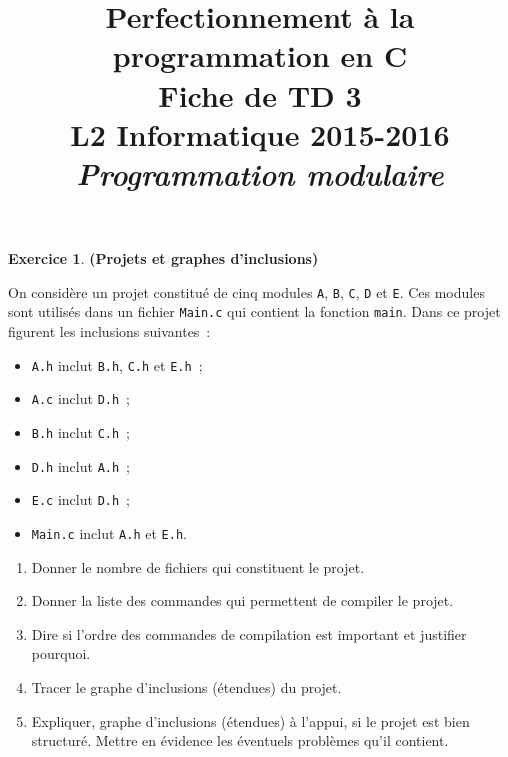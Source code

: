 \documentclass[12pt]{article}
\date{}
\title{{\bf Perfectionnement à la programmation en {\sf C}} \\
    Fiche de TD 3 \\
    {\small L2 Informatique 2015-2016} \\
    {\it \small Programmation modulaire}}
\theoremstyle{definition}
\newtheorem{Exercice}{Exercice}
\begin{document}
\maketitle

\begin{Exercice} {\bf (Projets et graphes d'inclusions)} \smallskip

    On considère un projet constitué de cinq modules {\tt A}, {\tt B},
    {\tt C}, {\tt D} et {\tt E}. Ces modules sont utilisés dans un
    fichier {\tt Main.c} qui contient la fonction {\tt main}. Dans ce
    projet figurent les inclusions suivantes~:
    \begin{multicols}{2}
    \begin{itemize}
        \item {\tt A.h} inclut {\tt B.h}, {\tt C.h} et {\tt E.h}~;
        \item {\tt A.c} inclut {\tt D.h}~;
        \item {\tt B.h} inclut {\tt C.h}~;
        \item {\tt D.h} inclut {\tt A.h}~;
        \item {\tt E.c} inclut {\tt D.h}~;
        \item {\tt Main.c} inclut {\tt A.h} et {\tt E.h}.
    \end{itemize}
    \end{multicols}

    \begin{enumerate}
        \item Donner le nombre de fichiers qui constituent le projet.
        \smallskip

        \item Donner la liste des commandes qui permettent de compiler
        le projet.
        \smallskip

        \item Dire si l'ordre des commandes de compilation est important
        et justifier pourquoi.
        \smallskip

        \item Tracer le graphe d'inclusions (étendues) du projet.
        \smallskip

        \item Expliquer, graphe d'inclusions (étendues) à l'appui, si le
        projet est bien structuré. Mettre en évidence les éventuels
        problèmes qu'il contient.
        \smallskip


\end{enumerate}
\end{Exercice}
\end{document}
